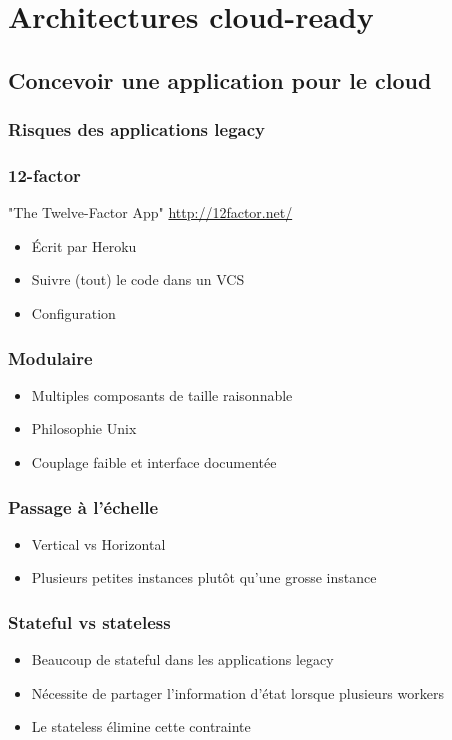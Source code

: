   \section[Architectures cloud]{Architectures cloud-ready}

  \subsection[Architecture dev]{Concevoir une application pour le cloud}

  \begin{frame}
    \frametitle{Risques des applications legacy}

  \end{frame}

  \begin{frame}
    \frametitle{12-factor}
    "The Twelve-Factor App" \url{http://12factor.net/}
    \begin{itemize}
      \item Écrit par Heroku
      \item Suivre (tout) le code dans un VCS
      \item Configuration
    \end{itemize}
  \end{frame}

  \begin{frame}
    \frametitle{Modulaire}
    \begin{itemize}
      \item Multiples composants de taille raisonnable
      \item Philosophie Unix
      \item Couplage faible et interface documentée
    \end{itemize}
  \end{frame}

  \begin{frame}
    \frametitle{Passage à l'échelle}
    \begin{itemize}
      \item Vertical vs Horizontal
      \item Plusieurs petites instances plutôt qu'une grosse instance
    \end{itemize}
  \end{frame}

  \begin{frame}
    \frametitle{Stateful vs stateless}
    \begin{itemize}
      \item Beaucoup de stateful dans les applications legacy
      \item Nécessite de partager l'information d'état lorsque plusieurs workers
      \item Le stateless élimine cette contrainte
    \end{itemize}
  \end{frame}

